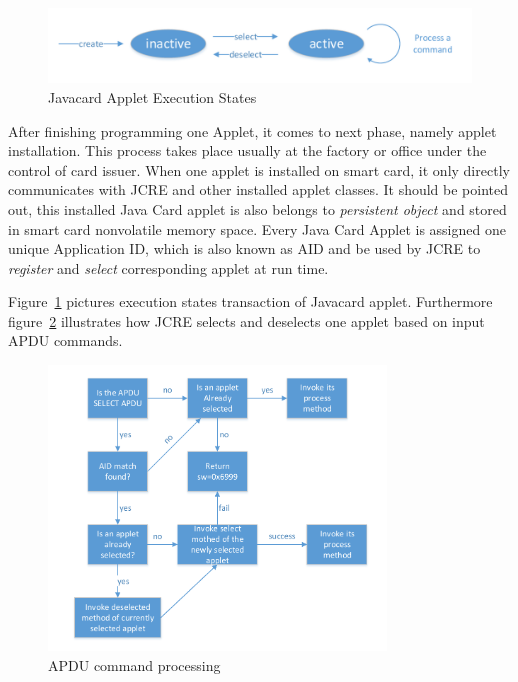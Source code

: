 \begin{figure}[!htbp]
	\centering
	\includegraphics[width=1\textwidth]{applet-execution-states}
		\caption{Javacard Applet Execution States\cite{handbuch}}
	\label{fig:applet-execution-states}
\end{figure}
After finishing programming one Applet, it comes to next phase, namely applet installation. This process takes place usually at the factory or office under the control of card issuer. When one applet is installed on smart card, it only directly communicates with JCRE and other installed applet classes. It should be pointed out, this installed Java Card applet is also belongs to \emph{persistent object} and stored in smart card nonvolatile memory space. Every Java Card Applet is assigned one unique Application ID, which is also known as AID and be used by JCRE to \emph{register} and \emph{select} corresponding applet at run time.

Figure~\ref{fig:applet-execution-states} pictures execution states transaction of Javacard applet. Furthermore figure~\ref{fig:apdu-command-processing} illustrates how JCRE selects and deselects one applet based on input APDU commands.

\begin{figure}[!htbp]
	\centering
	\includegraphics[width=0.8\textwidth]{apdu-command-processing}
		\caption{APDU command processing\cite{handbuch}}
	\label{fig:apdu-command-processing}
\end{figure}


